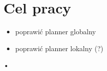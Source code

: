 \chapter{Cel pracy}
	\begin{itemize}
		\item poprawić planner globalny
		\item poprawić planner lokalny (?)
		
	\end{itemize}•